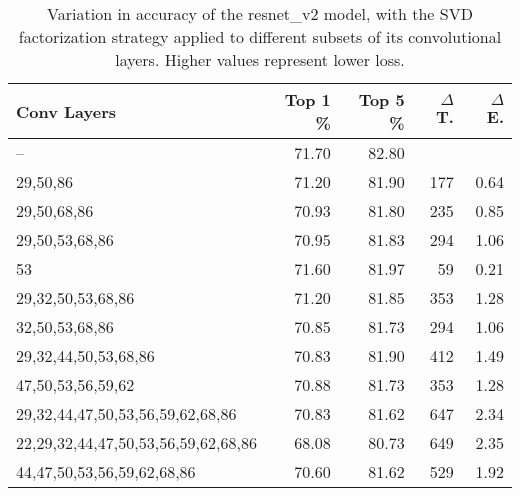 \begin{table}
\centering
\begin{tabular}{|l|r|r|r|r|}
\hline
Conv Layers & Top 1 \% & Top 5 \% & $\Delta$ T. & $\Delta$ E. \\\hline
-- & 71.70 & 82.80 &  & \\\hline
29,50,86 & 71.20 & 81.90 & 177 & 0.64 \\\hline
29,50,68,86 & 70.93 & 81.80 & 235 & 0.85 \\\hline
29,50,53,68,86 & 70.95 & 81.83 & 294 & 1.06 \\\hline
53 & 71.60 & 81.97 & 59 & 0.21 \\\hline
29,32,50,53,68,86 & 71.20 & 81.85 & 353 & 1.28 \\\hline
32,50,53,68,86 & 70.85 & 81.73 & 294 & 1.06 \\\hline
29,32,44,50,53,68,86 & 70.83 & 81.90 & 412 & 1.49 \\\hline
47,50,53,56,59,62 & 70.88 & 81.73 & 353 & 1.28 \\\hline
29,32,44,47,50,53,56,59,62,68,86 & 70.83 & 81.62 & 647 & 2.34 \\\hline
22,29,32,44,47,50,53,56,59,62,68,86 & 68.08 & 80.73 & 649 & 2.35 \\\hline
44,47,50,53,56,59,62,68,86 & 70.60 & 81.62 & 529 & 1.92 \\\hline
\end{tabular}
\caption{Variation in accuracy of the resnet\_v2 model, with the SVD factorization strategy applied to different subsets of its convolutional layers. Higher values represent lower loss.}
\label{resnet_v2-accuracy}
\end{table}
